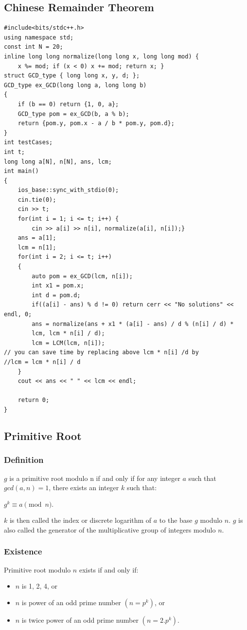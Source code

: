 \documentclass[8pt, a4paper, oneside, twocolumn]{extarticle}
\begin{document}
\subsection{Chinese Remainder Theorem}
\begin{verbatim}
#include<bits/stdc++.h>
using namespace std;
const int N = 20;
inline long long normalize(long long x, long long mod) { 
    x %= mod; if (x < 0) x += mod; return x; }
struct GCD_type { long long x, y, d; };
GCD_type ex_GCD(long long a, long long b)
{
    if (b == 0) return {1, 0, a};
    GCD_type pom = ex_GCD(b, a % b);
    return {pom.y, pom.x - a / b * pom.y, pom.d};
}
int testCases;
int t;
long long a[N], n[N], ans, lcm;
int main()
{
    ios_base::sync_with_stdio(0);
    cin.tie(0);
    cin >> t;
    for(int i = 1; i <= t; i++) {
        cin >> a[i] >> n[i], normalize(a[i], n[i]);}
    ans = a[1];
    lcm = n[1];
    for(int i = 2; i <= t; i++)
    {
        auto pom = ex_GCD(lcm, n[i]);
        int x1 = pom.x;
        int d = pom.d;
        if((a[i] - ans) % d != 0) return cerr << "No solutions" << endl, 0;
        ans = normalize(ans + x1 * (a[i] - ans) / d % (n[i] / d) * 
        lcm, lcm * n[i] / d);
        lcm = LCM(lcm, n[i]); 
// you can save time by replacing above lcm * n[i] /d by 
//lcm = lcm * n[i] / d
    }
    cout << ans << " " << lcm << endl;
 
    return 0;
}
\end{verbatim}
\subsection{Primitive Root}
\subsubsection{Definition}
$g$ is a primitive root modulo n if and only if for any integer $a$ such that $gcd(a, n) = 1$, there exists an integer $k$ such that:

$g^k \equiv a \pmod n$.

$k$ is then called the index or discrete logarithm of $a$ to the base $g$ modulo $n$. $g$ is also called the generator of the multiplicative group of integers modulo $n$.

\subsubsection{Existence}

Primitive root modulo $n$ exists if and only if:
\begin{itemize}
    \item $n$ is 1, 2, 4, or
    \item $n$ is power of an odd prime number $(n = p^k)$, or
    \item $n$ is twice power of an odd prime number $(n = 2 . p^k)$.
\end{itemize}
\end{document}
